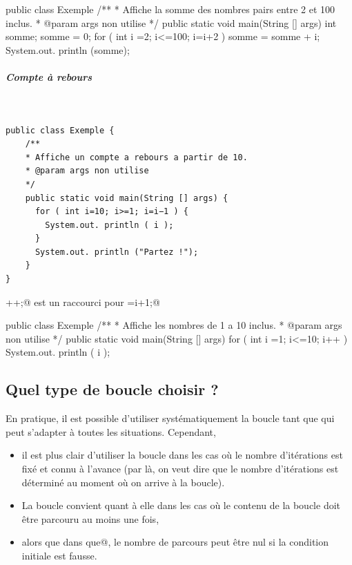 \documentclass[11pt,a4paper]{article}
\begin{document}
            \par
        \begin{Java}
public class Exemple {
    /**
    * Affiche la somme des nombres pairs entre 2 et 100 inclus.
    * @param args non utilise
    */
    public static void main(String [] args) {
      int somme;
      somme = 0;
      for ( int i =2; i<=100; i=i+2 ) {
        somme = somme + i;
      }
      System.out. println (somme);
    }
}\end{Java}
			
		\subparagraph{Compte \`a rebours} 
		
					\textcolor{white}{.} \par
				
            \par
        \begin{verbatim}
public class Exemple {
    /**
    * Affiche un compte a rebours a partir de 10.
    * @param args non utilise
    */
    public static void main(String [] args) {
      for ( int i=10; i>=1; i=i−1 ) {
        System.out. println ( i );
      }
      System.out. println ("Partez !");
    }
}\end{verbatim}\verb@i++;@ est un raccourci pour \verb@i =i+1;@
            \par
        \begin{Java}
public class Exemple {
    /**
    * Affiche les nombres de 1 a 10 inclus.
    * @param args non utilise
    */
    public static void main(String [] args) {
      for ( int i =1; i<=10; i++ ) {
        System.out. println ( i );
      }
    }
}\end{Java}\subsection{Quel type de boucle choisir ?}
		    En pratique, il est possible d'utiliser syst\'ematiquement la boucle tant que qui peut s'adapter
        \`a toutes les situations. Cependant, 
        
					\begin{itemize}
				
			\item 
              il est plus clair d'utiliser la boucle \verb@pour@ 
              dans les cas o\`u le nombre d'it\'erations est fix\'e et connu \`a l'avance
              (par l\`a, on veut dire que le nombre d'it\'erations est d\'etermin\'e au moment o\`u on arrive \`a la boucle). 
            
			\item 
              La boucle \verb@faire@ convient quant \`a elle dans les cas o\`u le contenu de la boucle doit \^etre parcouru au moins une fois,
            
			\item 
              alors que dans \verb@tant que@, le nombre de parcours peut \^etre nul si la condition initiale est fausse.
            
					\end{itemize}
				
\end{document}
